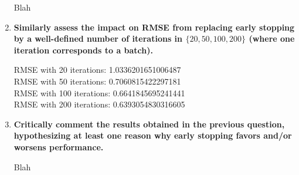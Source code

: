 \documentclass[12pt]{article}
\begin{document}
\begin{enumerate}[leftmargin=\labelsep]
          Blah

    \item \textbf{Similarly assess the impact on RMSE from replacing early stopping by a well-defined
          number of iterations in $\{20,50,100,200\}$ (where one iteration corresponds to a batch).}

           \vskip 0.3cm
          

          RMSE with 20 iterations: 1.0336201651006487  \\
          RMSE with 50 iterations: 0.7060815422297181  \\
          RMSE with 100 iterations: 0.6641845695241441 \\
          RMSE with 200 iterations: 0.6393054830316605 \\

    \item \textbf{Critically comment the results obtained in the previous question, hypothesizing at least
          one reason why early stopping favors and/or worsens performance.}

          \vskip 0.3cm
          Blah
\end{enumerate}
\end{document}
